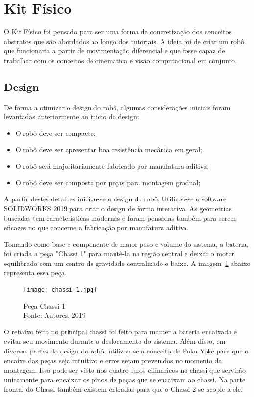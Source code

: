 \section{Kit Físico}
O Kit Físico foi pensado para ser uma forma de concretização dos conceitos abstratos que são abordados ao longo dos tutoriais. A ideia foi de criar um robô que funcionaria a partir de movimentação diferencial e que fosse capaz de trabalhar com os conceitos de cinematica e visão computacional em conjunto.

\subsection{Design}
De forma a otimizar o design do robô, algumas considerações iniciais foram levantadas anteriormente ao inicio do design:

\begin{itemize}
	\item O robô deve ser compacto;
	\item O robô deve ser apresentar boa resistência mecânica em geral;
	\item O robô será majoritariamente fabricado por manufatura aditiva;
	\item O robô deve ser composto por peças para montagem gradual; 
\end{itemize}
A partir destes detalhes iniciou-se o design do robô. Utilizou-se o software SOLIDWORKS 2019 para criar o design de forma interativa. As geometrias buscadas tem características modernas e foram pensadas também para serem eficazes no que concerne a fabricação por manufatura aditiva.

Tomando como base o componente de maior peso e volume do sistema, a bateria, foi criada a peça "Chassi 1" para mantê-la na região central e deixar o motor equilibrado com um centro de gravidade centralizado e baixo. A imagem~\ref{fig:chassi_1} abaixo representa essa peça.

\begin{figure}[h!]
	\centering
	\texttt{[image: chassi\_1.jpg]}\\
	\caption{Peça Chassi 1 \\ Fonte: Autores, 2019}
	\label{fig:chassi_1}
\end{figure}

O rebaixo feito no principal chassi foi feito para manter a bateria encaixada e evitar seu movimento durante o deslocamento do sistema. Além disso, em diversas partes do design do robô, utilizou-se o conceito de Poka Yoke para que o encaixe das peças seja intuitivo e erros sejam prevenidos no momento da montagem. Isso pode ser visto nos quatro furos cilíndricos no chassi que servirão unicamente para encaixar os pinos de peças que se encaixam ao chassi. Na parte frontal do Chassi também existem entradas para que o Chassi 2 se acople a ele.

